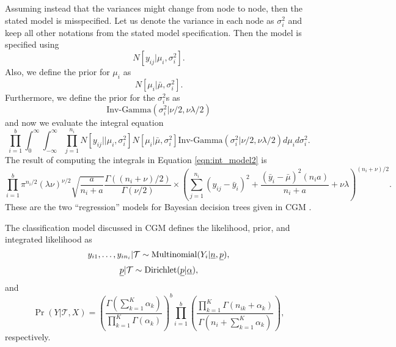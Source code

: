 Assuming instead that the variances might change from node to node, then the stated model is misspecified. Let us denote the variance in each node as $\sigma_i^2$ and keep all other notations from the stated model specification. Then the model is specified using 
\begin{equation}\label{eqn:normal_likelihood_many_variance}
N[y_{ij} \vert \mu_i, \sigma_i^2].
\end{equation}
Also, we define the prior for $\mu_i$ as 
\begin{equation}\label{eqn:multi_variance_prior}
N[\mu_i\vert \bar{\mu}, \sigma_i^2 ].
\end{equation}
Furthermore, we define the prior for the $\sigma_i^2$s as 
\begin{equation}\label{eqn:sigma_priors}
\text{Inv-Gamma}(\sigma_i^2\vert\nu/2, \nu\lambda/2)
\end{equation}
 and now we evaluate the integral equation 
 \begin{equation}\label{eqn:int_model2}
\prod_{i=1}^b \int_0^\infty \int_{-\infty}^{\infty} \prod_{j=1}^{n_i} N[y_{ij}\vert \vert \mu_i, \sigma_i^2]N[\mu_i\vert \bar{\mu}, \sigma_i^2 ]\text{Inv-Gamma}(\sigma_i^2\vert \nu/2, \nu\lambda/2)d\mu_id\sigma_i^2. 
\end{equation}
The result of computing the integrals in Equation \ref{eqn:int_model2} is 
\begin{equation}\label{eqn:int_model3}
\prod_{i=1}^b\pi^{n_i/2}(\lambda\nu)^{\nu/2}\sqrt{\frac{a}{n_i+a}}\frac{\Gamma((n_i+\nu)/2)}{\Gamma(\nu/2)}\times \left( \sum_{j=1}^{n_{i}}(y_{ij}-\bar{y}_i)^2+ \frac{(\bar{y}_i -\bar{\mu})^2(n_ia)}{n_i+a}+\nu\lambda  \right)^{(n_i+\nu)/2}.
\end{equation}
These are the two ``regression'' models  for Bayesian decision trees given in CGM \cite{chipman1998bayesian}. 

The classification model discussed in CGM \cite{chipman1998bayesian} defines the likelihood, prior, and integrated likelihood as
\begin{equation}
y_{i1}, \dots, y_{in_i} \vert \mathcal{T} \sim \text{Multinomial}(Y_i \vert \vec{n}, \vec{p}),\newnot{symbol:mult}
\end{equation} 
\begin{equation}
\vec{p} \vert \mathcal{T} \sim \text{Dirichlet}(\vec{p}\vert \vec{\alpha}), \newnot{symbol:dirichlet}
\end{equation} 
and
\begin{equation}\label{eqn:int_model4}
\Pr(Y\vert \mathcal{T}, X)=\left(\frac{\Gamma(\sum_{k=1}^K\alpha_k)}{\prod_{k=1}^K\Gamma(\alpha_k)} \right)^b \prod_{i=1}^b\left( \frac{\prod_{k=1}^K\Gamma(n_{ik}+\alpha_k)}{\Gamma(n_i +\sum_{k=1}^K\alpha_k)} \right),
\end{equation} 
respectively. 
 
